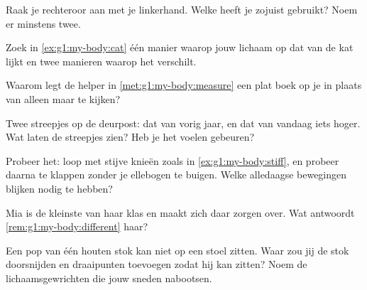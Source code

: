 \begin{exercise}[$\star$]\label{exo:g1:my-body:4}
Raak je rechteroor aan met je linkerhand. Welke  heeft je 
zojuist gebruikt? Noem er minstens twee.
\end{exercise}

\begin{exercise}[$\star$]\label{exo:g1:my-body:5}
Zoek in \cref{ex:g1:my-body:cat} één manier waarop jouw lichaam op dat
van de kat lijkt en twee manieren waarop het verschilt.
\end{exercise}

\begin{exercise}[$\star$]\label{exo:g1:my-body:6}
Waarom legt de helper in \cref{met:g1:my-body:measure} een plat boek op
je  in plaats van alleen maar te kijken?
\end{exercise}

\begin{exercise}[$\star$]\label{exo:g1:my-body:7}
Twee streepjes op de deurpost: dat van vorig jaar, en dat van vandaag
iets hoger. Wat laten de streepjes zien? Heb je het voelen gebeuren?
\end{exercise}

\begin{exercise}[$\star$]\label{exo:g1:my-body:8}
Probeer het: loop met stijve knieën zoals in \cref{ex:g1:my-body:stiff},
en probeer daarna te klappen zonder je ellebogen te buigen. Welke
alledaagse bewegingen blijken  nodig te hebben?
\end{exercise}

\begin{exercise}[$\star\star$]\label{exo:g1:my-body:9}
Mia is de kleinste van haar klas en maakt zich daar zorgen over. Wat
antwoordt \cref{rem:g1:my-body:different} haar?
\end{exercise}

\begin{exercise}[$\star\star$]\label{exo:g1:my-body:10}
Een pop van één houten stok kan niet op een stoel zitten. Waar zou jij
de stok doorsnijden en draaipunten toevoegen zodat hij kan zitten? Noem
de lichaamsgewrichten die jouw sneden nabootsen.
\end{exercise}
